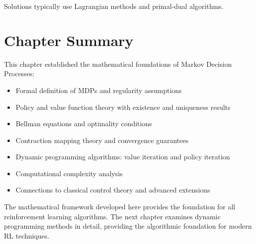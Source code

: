 Solutions typically use Lagrangian methods and primal-dual algorithms.

\section{Chapter Summary}

This chapter established the mathematical foundations of Markov Decision Processes:

\begin{itemize}
    \item Formal definition of MDPs and regularity assumptions
    \item Policy and value function theory with existence and uniqueness results
    \item Bellman equations and optimality conditions
    \item Contraction mapping theory and convergence guarantees
    \item Dynamic programming algorithms: value iteration and policy iteration
    \item Computational complexity analysis
    \item Connections to classical control theory and advanced extensions
\end{itemize}

The mathematical framework developed here provides the foundation for all reinforcement learning algorithms. The next chapter examines dynamic programming methods in detail, providing the algorithmic foundation for modern RL techniques.